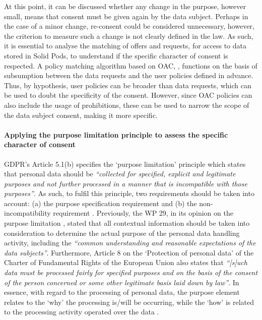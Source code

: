 At this point, it can be discussed whether any change in the purpose, however small, means that consent must be given again by the data subject.
Perhaps in the case of a minor change, re-consent could be considered unnecessary, however, the criterion to measure such a change is not clearly defined in the law. 
As such, it is essential to analyse the matching of offers and requests, for access to data stored in Solid Pods, to understand if the specific character of consent is respected.
A policy matching algorithm based on OAC, , functions on the basis of subsumption between the data requests and the user policies defined in advance.
Thus, by hypothesis, user policies can be broader than data requests, which can be used to doubt the specificity of the consent.
However, since OAC policies can also include the usage of prohibitions, these can be used to narrow the scope of the data subject consent, making it more specific.


\paragraph{Applying the purpose limitation principle to assess the specific character of consent}

GDPR's Article 5.1(b) \citeyearpar{noauthor_regulation_2016} specifies the `purpose limitation' principle which states that personal data should be \textit{``collected for specified, explicit and legitimate purposes and not further processed in a manner that is incompatible with those purposes''}.
As such, to fulfil this principle, two requirements should be taken into account: (a) the purpose specification requirement and (b) the non-incompatibility requirement \citep{koning_purpose_2020}. 
Previously, the WP 29, in its opinion on the purpose limitation \citep{article_29_data_protection_working_party_opinion_2013}, stated that all contextual information should be taken into consideration to determine the actual purpose of the personal data handling activity, including the \textit{``common understanding and
reasonable expectations of the data subjects''}.
Furthermore, Article 8 on the `Protection of personal data' of the Charter of Fundamental Rights of the European Union \citeyearpar{noauthor_charter_2000} also states that \textit{``[s]uch data must be processed fairly for specified purposes and on the basis of the consent of the person concerned or some other legitimate basis laid down by law''}.
In essence, with regard to the processing of personal data, the purpose element relates to the `why' the processing is/will be occurring, while the `how' is related to the processing activity operated over the data \citep{koning_purpose_2020}.

